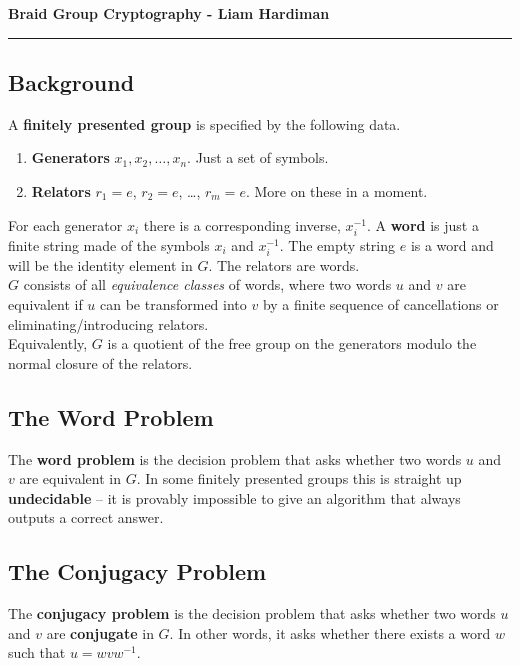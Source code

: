 \documentclass[11pt]{article}
\begin{document}
\begin{center}
{\bf \Large Braid Group Cryptography - Liam Hardiman}
\vspace{0.2cm}
\hrule
\end{center}

\subsection*{Background}
A \textbf{finitely presented group} is specified by the following data.
\begin{enumerate}
	\item \textbf{Generators} $x_1, x_2, \ldots, x_n$. Just a set of symbols.
	\item \textbf{Relators} $r_1 = e$, $r_2 = e$, \ldots, $r_m = e$. More on these in a moment.
\end{enumerate}

\indent For each generator $x_i$ there is a corresponding inverse, $x_i^{-1}$. A \textbf{word} is just a finite string made of the symbols $x_i$ and $x_i^{-1}$. The empty string $e$ is a word and will be the identity element in $G$. The relators are words.\\
\indent $G$ consists of all \textit{equivalence classes} of words, where two words $u$ and $v$ are equivalent if $u$ can be transformed into $v$ by a finite sequence of cancellations or eliminating/introducing relators.\\
\indent Equivalently, $G$ is a quotient of the free group on the generators modulo the normal closure of the relators. 

\subsection*{The Word Problem}
The \textbf{word problem} is the decision problem that asks whether two words $u$ and $v$ are equivalent in $G$. In some finitely presented groups this is straight up \textbf{undecidable} -- it is provably impossible to give an algorithm that always outputs a correct answer.

\subsection*{The Conjugacy Problem}
The \textbf{conjugacy problem} is the decision problem that asks whether two words $u$ and $v$ are \textbf{conjugate} in $G$. In other words, it asks whether there exists a word $w$ such that $u = wvw^{-1}$. 
\end{document}
